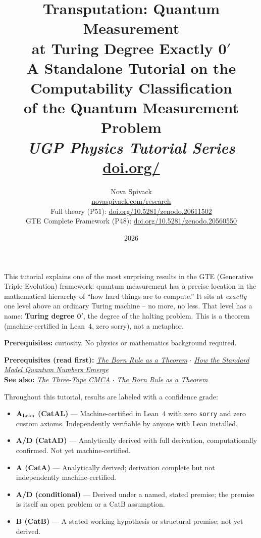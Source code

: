 \documentclass[11pt,a4paper]{article}
\title{\textbf{Transputation: Quantum Measurement\\[4pt]
at Turing Degree Exactly $\mathbf{0}'$}\\[8pt]
\large A Standalone Tutorial on the Computability Classification\\
of the Quantum Measurement Problem\\[4pt]\normalsize\textit{UGP Physics Tutorial Series}
\\[2pt]\small\href{https://doi.org/\TutorialDOI}{doi.org/\TutorialDOI}}
\author{Nova Spivack\\[4pt]
\normalsize
\href{https://novaspivack.com/research}{novaspivack.com/research}\\[2pt]
\small Full theory (P51):
\href{https://doi.org/10.5281/zenodo.20611502}{doi.org/10.5281/zenodo.20611502}\\[1pt]
\small GTE Complete Framework (P48):
\href{https://doi.org/10.5281/zenodo.20560550}{doi.org/10.5281/zenodo.20560550}
}
\date{2026}
\newcommand{\zerp}{\mathbf{0}'}
\begin{document}
\setcounter{tocdepth}{2}
\maketitle

\begin{tcolorbox}[colback=boxgray,colframe=gray!50,title=What This Tutorial Covers]
\small
This tutorial explains one of the most surprising results in the GTE (Generative Triple
Evolution) framework: quantum measurement has a precise location in the mathematical
hierarchy of ``how hard things are to compute.'' It sits at \emph{exactly} one level above
an ordinary Turing machine -- no more, no less. That level has a name:
\textbf{Turing degree $\zerp$}, the degree of the halting problem.
This is a theorem (machine-certified in Lean~4, zero sorry), not a metaphor.

\medskip
\textbf{Prerequisites:} curiosity. No physics or mathematics background required.
\end{tcolorbox}

\tableofcontents
\newpage

\begin{tcolorbox}[colback=blue!6,colframe=blue!40!black,
  title=\textbf{UGP Physics Tutorial Series}]
\textbf{Prerequisites (read first):} \href{https://doi.org/10.5281/zenodo.20657861}{\emph{The Born Rule as a Theorem}} $\cdot$ \href{https://doi.org/10.5281/zenodo.20657898}{\emph{How the Standard Model Quantum Numbers Emerge}}\\[4pt]
\textbf{See also:} \href{https://doi.org/10.5281/zenodo.20657906}{\emph{The Three-Tape CMCA}} $\cdot$ \href{https://doi.org/10.5281/zenodo.20657861}{\emph{The Born Rule as a Theorem}}
\end{tcolorbox}

\begin{tcolorbox}[colback=boxgreen,colframe=green!50!black,
  title=\textbf{Claim-Strength Taxonomy}]
Throughout this tutorial, results are labeled with a confidence grade:
\begin{itemize}[itemsep=2pt]
  \item \textbf{$\mathbf{A}_{\rm Lean}$ (CatAL)} --- Machine-certified in Lean~4 with zero \texttt{sorry} and zero custom axioms.  Independently verifiable by anyone with Lean installed.
  \item \textbf{A/D (CatAD)} --- Analytically derived with full derivation, computationally confirmed.  Not yet machine-certified.
  \item \textbf{A (CatA)} --- Analytically derived; derivation complete but not independently machine-certified.
  \item \textbf{A/D (conditional)} --- Derived under a named, stated premise; the premise is itself an open problem or a CatB assumption.
  \item \textbf{B (CatB)} --- A stated working hypothesis or structural premise; not yet derived.
\end{itemize}
\end{tcolorbox}
\end{document}
